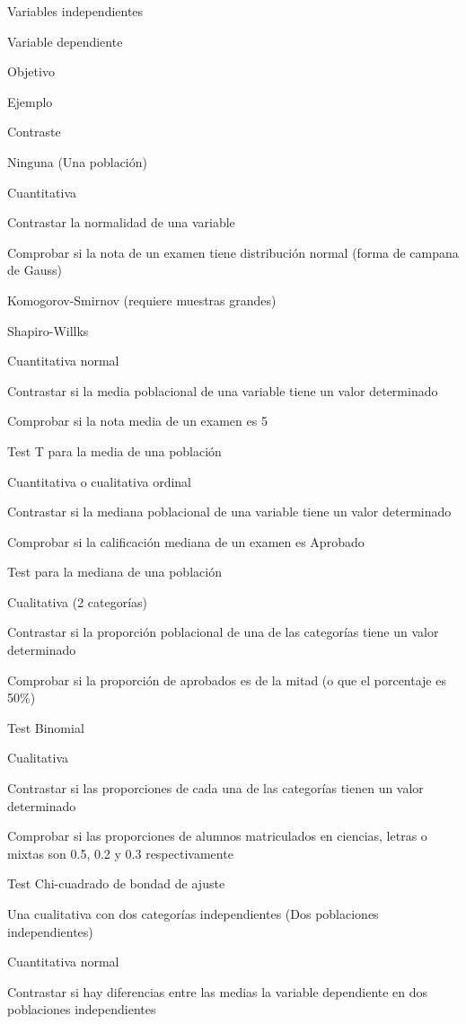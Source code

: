 \documentclass[
  a4paper,
]{scrreport}
\theoremstyle{definition}
\theoremstyle{definition}
\theoremstyle{remark}
\begin{document}
Variables independientes

Variable dependiente

Objetivo

Ejemplo

Contraste

Ninguna (Una población)

Cuantitativa

Contrastar la normalidad de una variable

Comprobar si la nota de un examen tiene distribución normal (forma de
campana de Gauss)

Komogorov-Smirnov (requiere muestras grandes)

Shapiro-Willks

Cuantitativa normal

Contrastar si la media poblacional de una variable tiene un valor
determinado

Comprobar si la nota media de un examen es 5

Test T para la media de una población

Cuantitativa o cualitativa ordinal

Contrastar si la mediana poblacional de una variable tiene un valor
determinado

Comprobar si la calificación mediana de un examen es Aprobado

Test para la mediana de una población

Cualitativa (2 categorías)

Contrastar si la proporción poblacional de una de las categorías tiene
un valor determinado

Comprobar si la proporción de aprobados es de la mitad (o que el
porcentaje es 50\%)

Test Binomial

Cualitativa

Contrastar si las proporciones de cada una de las categorías tienen un
valor determinado

Comprobar si las proporciones de alumnos matriculados en ciencias,
letras o mixtas son 0.5, 0.2 y 0.3 respectivamente

Test Chi-cuadrado de bondad de ajuste

Una cualitativa con dos categorías independientes (Dos poblaciones
independientes)

Cuantitativa normal

Contrastar si hay diferencias entre las medias la variable dependiente
en dos poblaciones independientes
\end{document}
